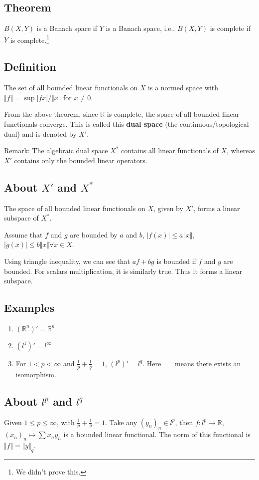 \documentclass[11pt]{article}
\def\R{\mathbb{R}}
\begin{document}
\subsection{Theorem}
\label{sec:org9c36de4}
\(B(X, Y)\) is a Banach space if \(Y\) is a Banach space, i.e., \(B(X, Y)\) is
complete if \(Y\) is complete.\footnote{We didn't prove this.}
\subsection{Definition}
\label{sec:orgfbb0f26}
The set of all bounded linear functionals on \(X\) is a normed space with
\(\Vert f \Vert = \sup \vert f x\vert / \Vert x \Vert\) for \(x \neq 0\).

From the above theorem, since \(\R\) is complete, the space of all bounded
linear functionals converge. This is called this \textbf{dual space} (the
continuous/topological dual) and is denoted by  \(X'\).

Remark: The algebraic dual space \(X^{*}\) contains all linear functionals of
\(X\), whereas \(X'\) contains only the bounded linear operators. 
\subsection{About \(X'\) and \(X^{*}\)}
\label{sec:orgd3871a5}
The space of all bounded linear functionals on \(X\), given by \(X'\), forms a
linear subspace of \(X^{*}\).

Assume that \(f\) and \(g\) are bounded by \(a\) and \(b\), \(\vert f(x) \vert \le a
   \Vert x \Vert\), \(\vert g(x) \vert \le b \Vert x \Vert \forall x\in X\).

Using triangle inequality, we can see that \(af + bg\) is bounded if \(f\) and
\(g\) are bounded. For scalars multiplication, it is similarly true. Thus it
forms a linear subspace.
\subsection{Examples}
\label{sec:org025ac02}
\begin{enumerate}
\item \((\R^n)' = \R^n\)
\item \((l^1)' = l^{\infty}\)
\item For \(1 < p < \infty\) and \(\frac{1}{p} + \frac{1}{q} = 1\), \((l^p)' = l^q\).
Here \(=\) means there exists an isomorphism.
\end{enumerate}
\subsection{About \(l^p\) and \(l^q\)}
\label{sec:org8ed5132}
Given \(1 \le p \le \infty\), with \(\frac{1}{p} + \frac{1}{q} = 1\). Take any
\((y_n)_n \in l^p\), then \(f\colon l^p \rightarrow \R\), \((x_n)_n \mapsto \sum
   x_n y_n\) is a bounded linear functional. The norm of this functional is
\(\Vert f \Vert = \Vert y \Vert_q\).
\end{document}

